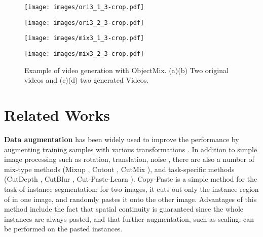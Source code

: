 \begin{figure}[t]
    \centering


    \begin{minipage}[t]{0.9\linewidth}
    \centering
    \texttt{[image: images/ori3\_1\_3-crop.pdf]}
    \subcaption{}
    \label{fig:base1}
    \end{minipage}
    \vspace{0.5em}

    \begin{minipage}[t]{0.9\linewidth}
    \centering
    \texttt{[image: images/ori3\_2\_3-crop.pdf]}
    \subcaption{}
    \label{fig:base2}
    \end{minipage}
    \vspace{0.5em}
    
    \begin{minipage}[t]{0.9\linewidth}
    \centering
    \texttt{[image: images/mix3\_1\_3-crop.pdf]}
    \subcaption{}
    \label{fig:mix1}
    \end{minipage}
    \vspace{0.5em}

    \begin{minipage}[t]{0.9\linewidth}
    \centering
    \texttt{[image: images/mix3\_2\_3-crop.pdf]}
    \subcaption{}
    \label{fig:mix2}
    \end{minipage}


    \caption{
    Example of video generation with ObjectMix.
    (a)(b) Two original videos and
    (c)(d) two generated Videos.
    }

    \label{fig:ObjectMix}
\end{figure}








\section{Related Works}



\noindent\textbf{Data augmentation}
has been widely used to improve the performance
by augmenting training samples with various transformations
\cite{DBLP:journals/air/KhalifaLM22,DBLP:journals/jbd/ShortenK19,DBLP:journals/corr/abs-2205-01491}.
In addition to simple image processing such as rotation, translation, noise \cite{imgaug,Albumentations},
there are also a number of mix-type methods
(Mixup \cite{Zhang_iclr18}, 
Cutout \cite{DBLP:journals/corr/abs-1708-04552}, 
CutMix \cite{Yun_2019_ICCV}),
and task-specific methods
(CutDepth \cite{CutDepth}, 
CutBlur \cite{CutBlur},
Cut-Paste-Learn \cite{cutpaste}).
Copy-Paste \cite{CopyPaste} is a simple method for the task of instance segmentation:
for two images, it cuts out only the instance region of in one image, and randomly pastes it onto the other image.
Advantages of this method include the fact that spatial continuity is guaranteed
since the whole instances are always pasted, and that further augmentation, such as scaling, can be performed on the pasted instances.




